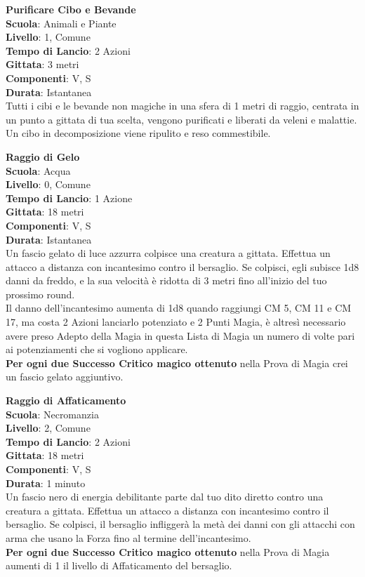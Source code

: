 \begin{multicols}{2}
\medskip\textbf{Purificare Cibo e Bevande}\\
\textbf{Scuola}: Animali e Piante\\
\textbf{Livello}: 1, Comune\\
\textbf{Tempo di Lancio}: 2 Azioni\\
\textbf{Gittata}: 3 metri\\
\textbf{Componenti}: V, S\\
\textbf{Durata}: Istantanea\\
Tutti i cibi e le bevande non magiche in una sfera di 1 metri di raggio, centrata in un punto a gittata di tua scelta, vengono purificati e liberati da veleni e malattie. Un cibo in decomposizione viene ripulito e reso commestibile.

\medskip\textbf{Raggio di Gelo}\\
\textbf{Scuola}: Acqua\\
\textbf{Livello}: 0, Comune\\
\textbf{Tempo di Lancio}: 1 Azione\\
\textbf{Gittata}: 18 metri\\
\textbf{Componenti}: V, S\\
\textbf{Durata}: Istantanea\\
Un fascio gelato di luce azzurra colpisce una creatura a gittata. Effettua un attacco a distanza con incantesimo contro il bersaglio. Se colpisci, egli subisce 1d8 danni da freddo, e la sua velocità è ridotta di 3 metri fino all'inizio del tuo prossimo round. \\
Il danno dell'incantesimo aumenta di 1d8 quando raggiungi CM 5, CM 11 e CM 17, ma costa 2 Azioni lanciarlo potenziato e 2 Punti Magia, è altresì necessario avere preso Adepto della Magia in questa Lista di Magia un numero di volte pari ai potenziamenti che si vogliono applicare.\\
\textbf{Per ogni due Successo Critico magico ottenuto} nella Prova di Magia crei un fascio gelato aggiuntivo.

\medskip\textbf{Raggio di Affaticamento}\\
\textbf{Scuola}: Necromanzia\\
\textbf{Livello}: 2, Comune\\
\textbf{Tempo di Lancio}: 2 Azioni\\
\textbf{Gittata}: 18 metri\\
\textbf{Componenti}: V, S\\
\textbf{Durata}: 1 minuto\\
Un fascio nero di energia debilitante parte dal tuo dito diretto contro una creatura a gittata. Effettua un attacco a distanza con incantesimo contro il bersaglio. Se colpisci, il bersaglio infliggerà la metà dei danni con gli attacchi con arma che usano la Forza fino al termine dell'incantesimo.\\
\textbf{Per ogni due Successo Critico magico ottenuto} nella Prova di Magia aumenti di 1 il livello di Affaticamento del bersaglio.


\end{multicols}
